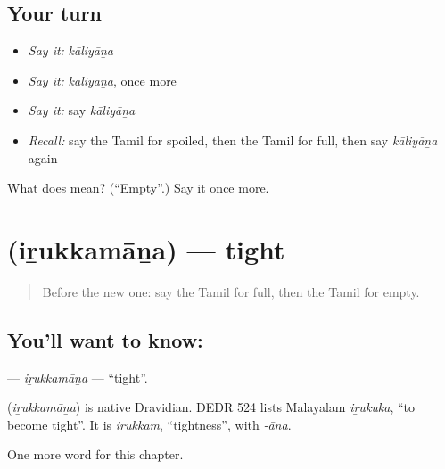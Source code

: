 \subsection*{Your turn}
\begin{itemize}
\raggedright
  \item \emph{Say it:} \emph{kāliyāṉa}
  \item \emph{Say it:} \emph{kāliyāṉa}, once more
  \item \emph{Say it:} say \emph{kāliyāṉa}
  \item \emph{Recall:} say the Tamil for spoiled, then the Tamil for full, then say \emph{kāliyāṉa} again
\end{itemize}

\begin{tcolorbox}[breakable,colback=teal!4,colframe=teal!35!black,title={Before you move on}]
What does  mean? (\textquotedblleft{}Empty\textquotedblright{}.) Say it once more.
\end{tcolorbox}
\section[\texorpdfstring{\ta{இறுக்கமான} (iṟukkamāṉa)}{இறுக்கமான (iṟukkamāṉa)}]{ (iṟukkamāṉa) — tight}

\label{lesson:TA-C209-irukkamana}



\begin{quote}
Before the new one: say the Tamil for full, then the Tamil for empty.
\end{quote}

\subsection*{You'll want to know: }
\textbf{} — \emph{iṟukkamāṉa} — \textquotedblleft{}tight\textquotedblright{}.

\begin{cousinweb}
\textbf{} (\emph{iṟukkamāṉa}) is native Dravidian. DEDR 524 lists Malayalam \emph{iṟukuka}, \textquotedblleft{}to become tight\textquotedblright{}. It is \emph{iṟukkam}, \textquotedblleft{}tightness\textquotedblright{}, with \emph{-āṉa}.
\end{cousinweb}

\begin{grammarlens}[title={What you've built}]
One more word for this chapter.
\end{grammarlens}

